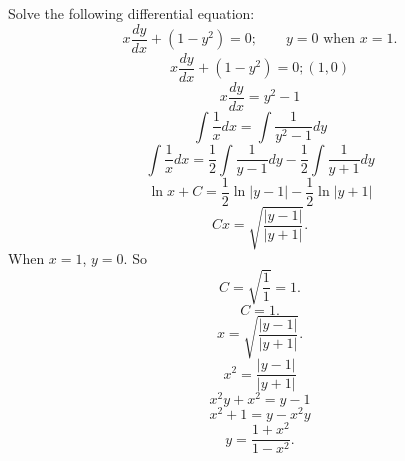 Solve the following differential equation:
\[
x\frac{dy}{dx} + (1-y^2) = 0; \quad \quad y = 0 \text{ when } x = 1.
\]
\newline
\[
x\frac{dy}{dx}+ (1-y^2) = 0; (1,0)
\]
\[
x\frac{dy}{dx} = y^2 - 1
\]
\[
\int \frac{1}{x}dx = \int \frac{1}{y^2-1}dy
\]
\[
\int \frac{1}{x}dx = \frac{1}{2}\int \frac{1}{y-1}dy - \frac{1}{2}\int\frac{1}{y+1}dy
\]
\[
\ln x + C =  \frac{1}{2}\ln|y-1| - \frac{1}{2}\ln|y+1|
\]
\[
Cx = \sqrt{\frac{|y-1|}{|y+1|}}.
\]
When $x = 1$, $y = 0$. So
\[
C = \sqrt{\frac{1}{1}} = 1.
\]
\[
C = 1.
\]
\[
x = \sqrt{\frac{|y-1|}{|y+1|}}.
\]
\[
x^2 = \frac{|y-1|}{|y+1|}
\]
\[
x^2y + x^2 = y - 1
\]
\[
x^2 + 1 = y - x^2y
\]
\[
y = \frac{1+x^2}{1-x^2}.
\]